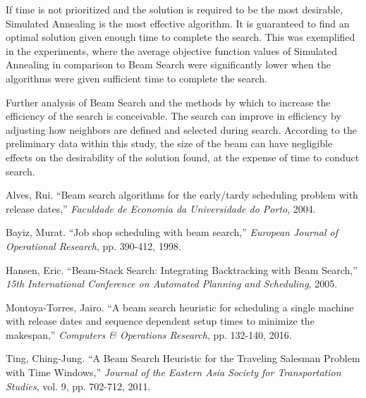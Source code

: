 \documentclass[10pt, twocolumn]{article}
\begin{document}
If time is not prioritized and the solution is required to be the most desirable, Simulated Annealing is the most effective algorithm. It is guaranteed to find an optimal solution given enough time to complete the search. This was exemplified in the experiments, where the average objective function values of Simulated Annealing in comparison to Beam Search were significantly lower when the algorithms were given sufficient time to complete the search.

Further analysis of Beam Search and the methods by which to increase the efficiency of the search is conceivable. The search can improve in efficiency by adjusting how neighbors are defined and selected during search. According to the preliminary data within this study, the size of the beam can have negligible effects on the desirability of the solution found, at the expense of time to conduct search.

\begin{thebibliography}{10}

 Alves, Rui. ``Beam search algorithms for the early/tardy scheduling problem with release dates,'' {\em Faculdade de Economia da Universidade do Porto}, 2004.

 Bayiz, Murat. ``Job shop scheduling with beam search,'' {\em European Journal of Operational Research}, pp. 390-412, 1998.

 Hansen, Eric. ``Beam-Stack Search: Integrating Backtracking with Beam Search,'' {\em 15th International Conference on Automated Planning and Scheduling}, 2005.

 Montoya-Torres, Jairo. ``A beam search heuristic for scheduling a single machine with release dates and sequence dependent setup times to minimize the makespan,'' {\em Computers \& Operations Research}, pp. 132-140, 2016.

 Ting, Ching-Jung. ``A Beam Search Heuristic for the Traveling Salesman Problem with Time Windows,'' {\em Journal of the Eastern Asia Society for Transportation Studies}, vol. 9, pp. 702-712, 2011.


\end{thebibliography}
\end{document}
